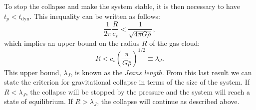 To stop the collapse and make the system stable, it is then necessary to have $t_p<t_{\mathrm{dyn}}$. This inequality can be written as follows:
\begin{equation}
\frac{1}{2\pi}\frac{R}{c_s}<\frac{1}{\sqrt{4\pi G \bar{\rho}}},
\end{equation}
which implies an upper bound on the radius $R$ of the gas cloud:
\begin{equation} \label{eq:jeans_def}
R< c_s\left(\frac{\pi}{G\bar{\rho}}\right)^{1/2} \equiv \lambda_J.
\end{equation}
This upper bound, $\lambda_J$, is known as the {\it Jeans length}. From this last result we can state the criterion for gravitational collapse in terms of the size of the system. If $R<\lambda_J$, the collapse will be stopped by the pressure and the system will reach a state of equilibrium. If $R>\lambda_J$, the collapse will continue as described above.


